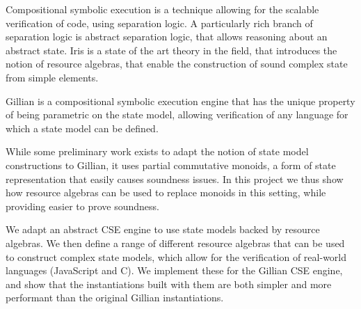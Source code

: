 Compositional symbolic execution is a technique allowing for the scalable verification of code, using separation logic. A particularly rich branch of separation logic is abstract separation logic, that allows reasoning about an abstract state. Iris is a state of the art theory in the field, that introduces the notion of resource algebras, that enable the construction of sound complex state from simple elements.

Gillian is a compositional symbolic execution engine that has the unique property of being parametric on the state model, allowing verification of any language for which a state model can be defined.

While some preliminary work exists to adapt the notion of state model constructions to Gillian, it uses partial commutative monoids, a form of state representation that easily causes soundness issues. In this project we thus show how resource algebras can be used to replace monoids in this setting, while providing easier to prove soundness.

We adapt an abstract CSE engine to use state models backed by resource algebras. We then define a range of different resource algebras that can be used to construct complex state models, which allow for the verification of real-world languages (JavaScript and C). We implement these for the Gillian CSE engine, and show that the instantiations built with them are both simpler and more performant than the original Gillian instantiations.
